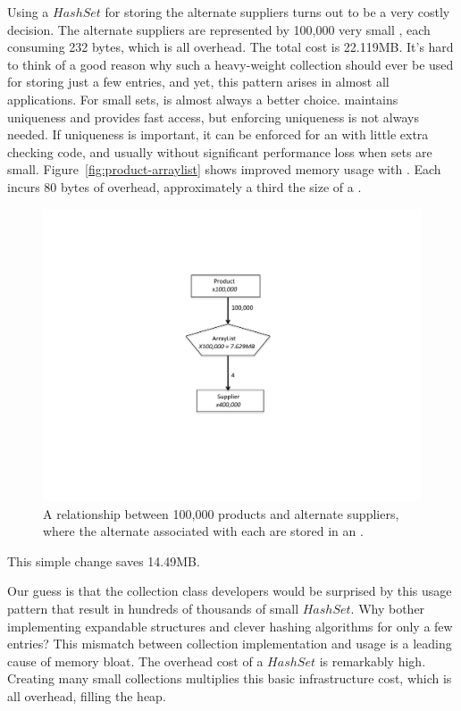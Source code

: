 Using a $HashSet$ for storing the alternate suppliers turns out to be a very
costly decision. The alternate suppliers are represented by 100,000
very small , each consuming 232 bytes, which is all overhead.
The total cost is 22.119MB. 
It's hard to think of a good reason why such a heavy-weight collection should ever be used
 for storing just a few entries, and yet, this pattern arises in almost all
 applications. For small sets,  is almost always a better choice. 
  maintains uniqueness
  and provides fast access, but enforcing uniqueness
is not always needed. If uniqueness is
important, it can be enforced for an  
 with  little extra checking code, and usually without significant performance
 loss when sets are small. Figure~\ref{fig:product-arraylist} shows improved
 memory usage with . Each  incurs 80 bytes of overhead,
approximately a third the size of a .
 \begin{figure}
  \centering
 \includegraphics[width=.80\textwidth]{part1/Figures/collections/product-arraylist.pdf}
 \caption{A relationship between 100,000 products and alternate suppliers,
 where the alternate  associated with each  are
 stored in an .}
  \label{fig:graph-arraylist}
\end{figure}
This simple change saves 14.49MB. 

Our guess is that the
collection class developers would be surprised by this usage pattern that result
in hundreds of thousands of small $HashSet$. Why bother implementing expandable
structures and clever hashing algorithms for only a few entries?
This mismatch between collection implementation and usage is 
a leading cause of memory bloat. The overhead cost of a $HashSet$ is remarkably
high. Creating many small collections multiplies this basic infrastructure
cost, which is all overhead, filling the heap. 

